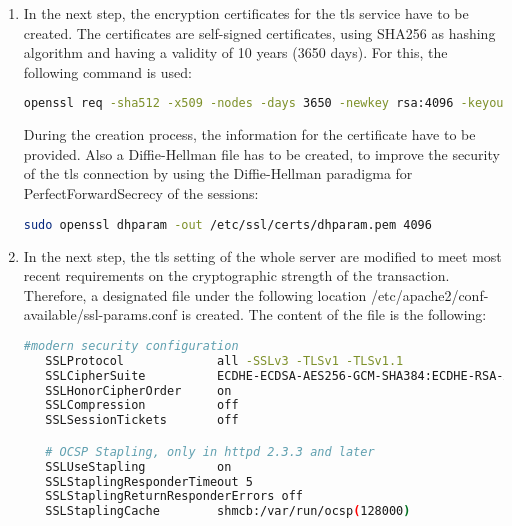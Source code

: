 \begin{enumerate}
  \item In the next step, the encryption certificates for the tls service have to be created. The certificates are self-signed certificates, using SHA256 as hashing algorithm and having a validity of 10 years (3650 days). For this, the following command is used:
  \begin{lstlisting}[language=bash]
   openssl req -sha512 -x509 -nodes -days 3650 -newkey rsa:4096 -keyout /etc/ssl/private/[servername].key -out /etc/ssl/certs/[servername].crt
  \end{lstlisting}
  During the creation process, the information for the certificate have to be provided. Also a Diffie-Hellman file has to be created, to improve the security of the tls connection 
  by using the Diffie-Hellman paradigma for PerfectForwardSecrecy of the sessions:
  \begin{lstlisting}[language=bash]
   sudo openssl dhparam -out /etc/ssl/certs/dhparam.pem 4096
  \end{lstlisting}
  \item In the next step, the tls setting of the whole server are modified to meet most recent requirements on the cryptographic strength of the transaction. Therefore, a 
  designated file under the following location /etc/apache2/conf-available/ssl-params.conf is created. The content of the file is the following:
  \begin{lstlisting}[language=bash]
   #modern security configuration
   SSLProtocol             all -SSLv3 -TLSv1 -TLSv1.1
   SSLCipherSuite          ECDHE-ECDSA-AES256-GCM-SHA384:ECDHE-RSA-AES256-GCM-SHA384:ECDHE-ECDSA-CHACHA20-POLY1305:ECDHE-RSA-CHACHA20-POLY1305:ECDHE-ECDSA-AES128-GCM-SHA256:ECDHE-RSA-AES128-GCM-SHA256:ECDHE-ECDSA-AES256-SHA384:ECDHE-RSA-AES256-SHA384:ECDHE-ECDSA-AES128-SHA256:ECDHE-RSA-AES128-SHA256
   SSLHonorCipherOrder     on
   SSLCompression          off
   SSLSessionTickets       off

   # OCSP Stapling, only in httpd 2.3.3 and later
   SSLUseStapling          on
   SSLStaplingResponderTimeout 5
   SSLStaplingReturnResponderErrors off
   SSLStaplingCache        shmcb:/var/run/ocsp(128000)


\end{lstlisting}
\end{enumerate}
